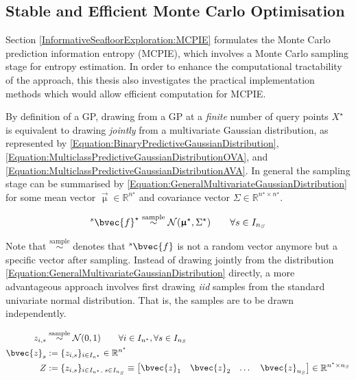 		\subsection{Stable and Efficient Monte Carlo Optimisation}
		\label{Appendix:ComputationalAspects:NumericalStability:MonteCarlo}
		
			Section \ref{InformativeSeafloorExploration:MCPIE} formulates the Monte Carlo prediction information entropy (MCPIE), which involves a Monte Carlo sampling stage for entropy estimation. In order to enhance the computational tractability of the approach, this thesis also investigates the practical implementation methods which would allow efficient computation for MCPIE.
			
			By definition of a GP, drawing from a GP at a \textit{finite} number of query points $X^{\star}$ is equivalent to drawing \textit{jointly} from a multivariate Gaussian distribution, as represented by \eqref{Equation:BinaryPredictiveGaussianDistribution}, \eqref{Equation:MulticlassPredictiveGaussianDistributionOVA}, and \eqref{Equation:MulticlassPredictiveGaussianDistributionAVA}. In general the sampling stage can be summarised by \eqref{Equation:GeneralMultivariateGaussianDistribution} for some mean vector $\vec{\upmu} \in \mathbb{R}^{n^{\star}}$ and covariance vector $\Sigma \in \mathbb{R}^{n^{\star} \times n^{\star}}$. 
			
			\begin{equation}
				{^{s}}\bvec{f}^{\star} \stackrel{\text{sample}}{\sim} \mathcal{N}(\vec{\upmu}^{\star}, \Sigma^{\star}) \qquad \forall s \in I_{n_{S}}
			\label{Equation:GeneralMultivariateGaussianDistribution}
			\end{equation}
			
			Note that $\stackrel{\text{sample}}{\sim}$ denotes that ${^{s}}\bvec{f}$ is not a random vector anymore but a specific vector after sampling. Instead of drawing jointly from the distribution \eqref{Equation:GeneralMultivariateGaussianDistribution} directly, a more advantageous approach involves first drawing \textit{iid} samples from the standard univariate normal distribution. That is, the samples are to be drawn independently.
			
			\begin{equation}
				\begin{aligned}
					z_{i, s} &\stackrel{\text{sample}}{\sim} \mathcal{N}(0, 1) \qquad \forall i \in I_{n^{\star}}, \forall s \in I_{n_{S}} \\
					\bvec{z}_{s} &:= \{z_{i, s}\}_{i \in I_{n^{\star}}} \in \mathbb{R}^{n^{\star}} \\
					Z &:= \{z_{i, s}\}_{i \in I_{n^{\star}}, \; s \in I_{n_{S}}} \equiv \begin{bmatrix} \bvec{z}_{1} & \bvec{z}_{2} & \dots & \bvec{z}_{n_{S}} \end{bmatrix} \in \mathbb{R}^{n^{\star} \times n_{S}}
				\end{aligned}
			\label{Equation:iidGaussianSampling}
			\end{equation}			
			
